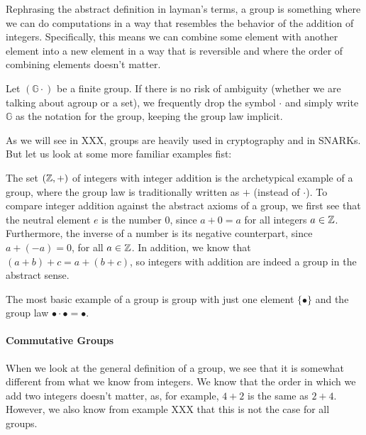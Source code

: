 Rephrasing the abstract definition in layman's terms, a group is something where we can do computations in a way that resembles the behavior of the addition of integers. Specifically, this means we can combine some element with another element into a new element in a way that is reversible and where the order of combining elements doesn't matter.
\begin{notation}
Let $(\mathbb{G}\cdot)$ be a finite group. If there is no risk of ambiguity (whether we are talking about agroup or a set), we frequently drop the symbol $\cdot$ and simply write $\mathbb{G}$ as the notation for the group, keeping the group law implicit.
\end{notation}
As we will see in XXX, groups are heavily used in cryptography and in SNARKs. But let us look at some more familiar examples fist:
\begin{example}
The set $(\mathbb{Z},+)$ of integers with integer addition is the archetypical example of a group, where the group law is traditionally written as $+$ (instead of $\cdot$). To compare integer addition against the abstract axioms of a group, we first see that the neutral element $e$ is the number $0$, since $a+0=a$ for all integers $a\in \mathbb{Z}$. Furthermore, the inverse of a number is its negative counterpart, since $a+(-a)=0$, for all $a\in\mathbb{Z}$. In addition, we know that $(a+b)+c=a+(b+c)$, so integers with addition are indeed a group in the abstract sense.
\end{example}
\begin{example}
The most basic example of a group is group with just one element $\{\bullet\}$ and the group law $\bullet\cdot \bullet=\bullet$. 
\end{example}
\paragraph{Commutative Groups} When we look at the general definition of a group, we see that it is somewhat different from what we know from integers. We know that the order in which we add two integers doesn't matter, as, for example, $4+2$ is the same as $2+4$. However, we also know from example XXX that this is not the case for all groups.

